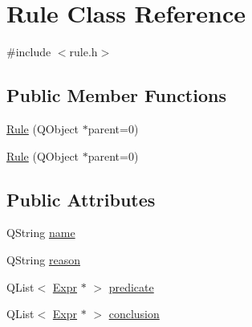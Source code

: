 \hypertarget{class_rule}{
\section{Rule Class Reference}
\label{class_rule}
}


{\ttfamily \#include $<$rule.h$>$}

\subsection*{Public Member Functions}
\begin{DoxyCompactItemize}
\item 
\hyperlink{class_rule_a209e7e54602b019f89a93651cc6d11ad}{Rule} (QObject $\ast$parent=0)
\item 
\hyperlink{class_rule_a209e7e54602b019f89a93651cc6d11ad}{Rule} (QObject $\ast$parent=0)
\end{DoxyCompactItemize}
\subsection*{Public Attributes}
\begin{DoxyCompactItemize}
\item 
QString \hyperlink{class_rule_af5e25a3d83f8963196a15e4809900272}{name}
\item 
QString \hyperlink{class_rule_a58f0a170115a8423414eb67c8b3f541d}{reason}
\item 
QList$<$ \hyperlink{class_expr}{Expr} $\ast$ $>$ \hyperlink{class_rule_ab55a8077095ffcc02e641a391d0b8654}{predicate}
\item 
QList$<$ \hyperlink{class_expr}{Expr} $\ast$ $>$ \hyperlink{class_rule_a4b9f24353c786012ea35a3084b532bf4}{conclusion}
\end{DoxyCompactItemize}


